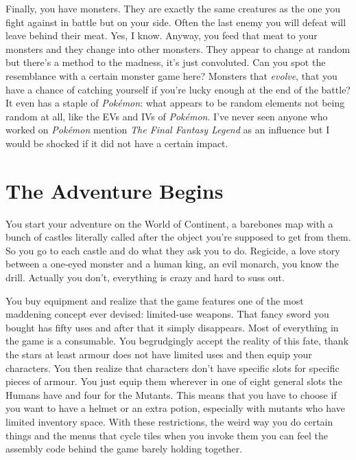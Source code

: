 \documentclass{book}
\begin{document}
\FloatBarrier\vspace{\baselineskip}\begin{figure}[H]\end{figure}
Finally, you have monsters. They are exactly the same creatures as the one you fight against in battle but on your side. Often the last enemy you will defeat will leave behind their meat. Yes, I know. Anyway, you feed that meat to your monsters and they change into other monsters. They appear to change at random but there’s a method to the madness, it’s just convoluted. Can you spot the resemblance with a certain monster game here? Monsters that \emph{evolve}, that you have a chance of catching yourself if you’re lucky enough at the end of the battle? It even has a staple of \emph{Pokémon}: what appears to be random elements not being random at all, like the EVs and IVs of \emph{Pokémon}. I’ve never seen anyone who worked on \emph{Pokémon} mention \emph{The Final Fantasy Legend} as an influence but I would be shocked if it did not have a certain impact.\par
\FloatBarrier\section*{The Adventure Begins}
You start your adventure on the World of Continent, a barebones map with a bunch of castles literally called after the object you’re supposed to get from them. So you go to each castle and do what they ask you to do. Regicide, a love story between a one-eyed monster and a human king, an evil monarch, you know the drill. Actually you don’t, everything is crazy and hard to suss out.\par
You buy equipment and realize that the game features one of the most maddening concept ever devised: limited-use weapons. That fancy sword you bought has fifty uses and after that it simply disappears. Most of everything in the game is a consumable. You begrudgingly accept the reality of this fate, thank the stars at least armour does not have limited uses and then equip your characters. You then realize that characters don’t have specific slots for specific pieces of armour. You just equip them wherever in one of eight general slots the Humans have and four for the Mutants. This means that you have to choose if you want to have a helmet or an extra potion, especially with mutants who have limited inventory space. With these restrictions, the weird way you do certain things and the menus that cycle tiles when you invoke them you can feel the assembly code behind the game barely holding together.\par
\end{document}
